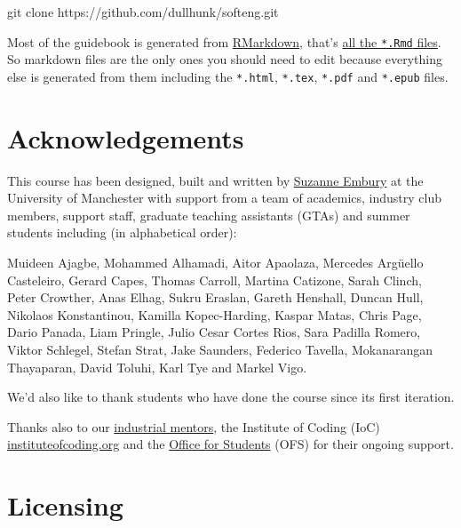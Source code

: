 \documentclass[
]{book}
\newenvironment{Shaded}{\begin{snugshade}}{\end{snugshade}}
\newcommand{\NormalTok}[1]{#1}
\begin{document}
\begin{Shaded}
\begin{Highlighting}[]
\NormalTok{git clone https://github.com/dullhunk/softeng.git}
\end{Highlighting}
\end{Shaded}

Most of the guidebook is generated from \href{https://en.wikipedia.org/wiki/Markdown}{RMarkdown}, that's \href{https://github.com/dullhunk/softeng/search?l=RMarkdown}{all the \texttt{*.Rmd} files}. So markdown files are the only ones you should need to edit because everything else is generated from them including the \texttt{*.html}, \texttt{*.tex}, \texttt{*.pdf} and \texttt{*.epub} files.

\hypertarget{teambury}{%
\section{Acknowledgements}\label{teambury}}

This course has been designed, built and written by \href{http://www.cs.man.ac.uk/~embury/}{Suzanne Embury} at the University of Manchester with support from a team of academics, industry club members, support staff, graduate teaching assistants (GTAs) and summer students including (in alphabetical order):

Muideen Ajagbe, Mohammed Alhamadi, Aitor Apaolaza, Mercedes Argüello Casteleiro, Gerard Capes, Thomas Carroll, Martina Catizone, Sarah Clinch, Peter Crowther, Anas Elhag, Sukru Eraslan, Gareth Henshall, Duncan Hull, Nikolaos Konstantinou, Kamilla Kopec-Harding, Kaspar Matas, Chris Page, Dario Panada, Liam Pringle, Julio Cesar Cortes Rios, Sara Padilla Romero, Viktor Schlegel, Stefan Strat, Jake Saunders, Federico Tavella, Mokanarangan Thayaparan, David Toluhi, Karl Tye and Markel Vigo.

We'd also like to thank students who have done the course since its first iteration.

Thanks also to our \href{https://www.cs.manchester.ac.uk/connect/business-engagement/industrial-mentoring/}{industrial mentors}, the Institute of Coding (IoC) \href{https://instituteofcoding.org/}{instituteofcoding.org} and the \href{https://www.officeforstudents.org.uk/}{Office for Students} (OFS) for their ongoing support.

\hypertarget{license}{%
\section{Licensing}\label{license}}
\end{document}
